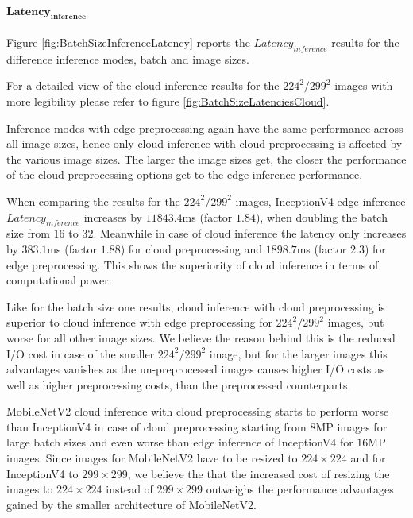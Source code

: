 \paragraph{$\mathbf{Latency_{inference}}$}
Figure \ref{fig:BatchSizeInferenceLatency} reports the $Latency_{inference}$ results for the difference inference modes, batch and image sizes.

For a detailed view of the cloud inference results for the $224^2/299^2$ images with more legibility please refer to figure \ref{fig:BatchSizeLatenciesCloud}.

Inference modes with edge preprocessing again have the same performance across all image sizes, hence only cloud inference with cloud preprocessing is affected by the various image sizes.
The larger the image sizes get, the closer the performance of the cloud preprocessing options get to the edge inference performance.

When comparing the results for the $224^2/299^2$ images, InceptionV4 edge inference $Latency_{inference}$ increases by $11843.4$ms (factor $1.84$), when doubling the batch size from $16$ to $32$.
Meanwhile in case of cloud inference the latency only increases by $383.1$ms (factor $1.88$) for cloud preprocessing and $1898.7$ms (factor $2.3$) for edge preprocessing.
This shows the superiority of cloud inference in terms of computational power.

Like for the batch size one results, cloud inference with cloud preprocessing is superior to cloud inference with edge preprocessing  for $224^2/299^2$ images, but worse for all other image sizes.
We believe the reason behind this is the reduced I/O cost in case of the smaller $224^2/299^2$ image, but for the larger images this advantages vanishes as the un-preprocessed images causes higher I/O costs as well as higher preprocessing costs, than the preprocessed counterparts.

MobileNetV2 cloud inference with cloud preprocessing starts to perform worse than InceptionV4 in case of cloud preprocessing starting from $8$MP images for large batch sizes and even worse than edge inference of InceptionV4 for $16$MP images.
Since images for MobileNetV2 have to be resized to $224\times224$ and for InceptionV4 to $299\times299$, we believe the that the increased cost of resizing the images to $224\times224$ instead of $299\times299$ outweighs the performance advantages gained by the smaller architecture of MobileNetV2.

